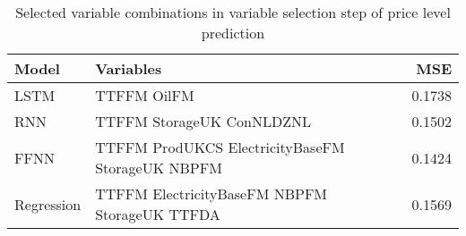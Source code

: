 \begin{table}[h!]
\centering
 \begin{adjustbox}{max width=\textwidth}
\begin{tabular}{llr}
  \hline
Model & Variables & MSE \\ 
  \hline
LSTM & TTFFM OilFM & 0.1738 \\ 
  RNN & TTFFM StorageUK ConNLDZNL & 0.1502 \\ 
  FFNN & TTFFM ProdUKCS ElectricityBaseFM StorageUK NBPFM & 0.1424 \\ 
  Regression & TTFFM ElectricityBaseFM NBPFM StorageUK TTFDA & 0.1569 \\ 
   \hline
 \end{tabular}
\end{adjustbox}
\caption{Selected variable combinations in variable selection step of price level prediction} 
\label{tab:level.var.selection.short}
\end{table}

